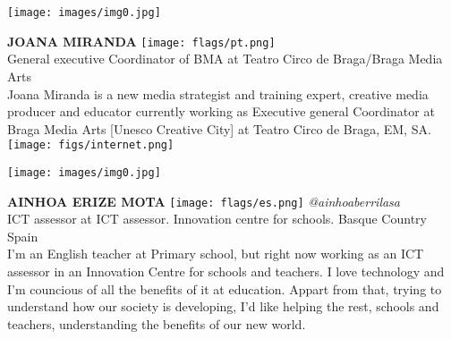\noindent
\begin{minipage}{0.3\textwidth}
\centering
\texttt{[image: images/img0.jpg]}
\end{minipage}
\hfill
\begin{minipage}{0.6\textwidth}\raggedright
\color{color1}\uppercase{\textbf{Joana Miranda}}
\color{color2}\hspace{0.2cm}\texttt{[image: flags/pt.png]}
\\
General executive Coordinator of BMA at Teatro Circo de Braga/Braga Media Arts\\
{\footnotesize Joana Miranda is a new media strategist and training expert, creative media producer and educator currently working as Executive general Coordinator at Braga Media Arts [Unesco Creative City] at Teatro Circo de Braga, EM, SA.}\\
\texttt{[image: figs/internet.png]}
\end{minipage}
\newline\newline\newline

\noindent
\begin{minipage}{0.3\textwidth}
\centering
\texttt{[image: images/img0.jpg]}
\end{minipage}
\hfill
\begin{minipage}{0.6\textwidth}\raggedright
\color{color1}\uppercase{\textbf{Ainhoa Erize Mota}}
\color{color2}\hspace{0.2cm}\texttt{[image: flags/es.png]}
\hspace{0.2cm}\textit{@ainhoaberrilasa}
\\
ICT assessor at ICT assessor. Innovation centre for schools. Basque Country Spain\\
{\footnotesize I'm an English teacher at Primary school, but right now working as an ICT assessor in an Innovation Centre for schools and teachers. I love technology and I'm councious of all the benefits of it at education. Appart from that, trying to understand how our society is developing, I'd like helping the rest, schools and teachers, understanding the benefits of our new world. }\\
\end{minipage}
\newline\newline\newline

